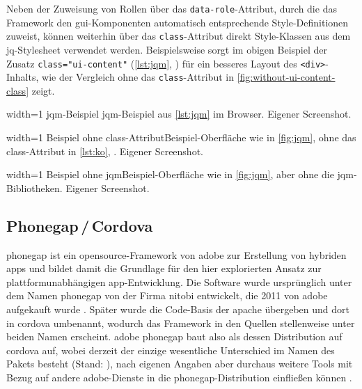 Neben der Zuweisung von Rollen über das \lstinline|data-role|-Attribut, durch die das Framework den \gls{gui}-Komponenten automatisch entsprechende Style-Definitionen zuweist, können weiterhin über das \lstinline|class|-Attribut direkt Style-Klassen aus dem \gls{jq}-Stylesheet verwendet werden.
Beispielsweise sorgt im obigen Beispiel der Zusatz \lstinline|class="ui-content"| (\autoref{lst:jqm}, ) für ein besseres Layout des \lstinline|<div>|-Inhalts, wie der Vergleich ohne das \lstinline|class|-Attribut in \autoref{fig:without-ui-content-class} zeigt.


	{width=1\textwidth}
	{\gls{jqm}-Beispiel}
	{\gls{jqm}-Beispiel aus \autoref{lst:jqm} im Browser.}
	{Eigener Screenshot.}

	{width=1\textwidth}
	{Beispiel ohne class-Attribut}{Beispiel-Oberfläche wie in \autoref{fig:jqm}, ohne das class-Attribut in \autoref{lst:ko}, .}
	{Eigener Screenshot.}

	{width=1\textwidth}
	{Beispiel ohne \gls{jqm}}{Beispiel-Oberfläche wie in \autoref{fig:jqm}, aber ohne die \gls{jqm}-Bibliotheken.}
	{Eigener Screenshot.}

\subsection{Phonegap\,/\,Cordova} \label{sec:cordova}


\gls{phonegap} ist ein \gls{opensource}-Framework von \gls{adobe} zur Erstellung von hybriden \glspl{app} und bildet damit die Grundlage für den hier explorierten Ansatz zur plattformunabhängigen \gls{app}-Entwicklung.
Die Software wurde ursprünglich unter dem Namen \gls{phonegap} von der Firma \gls{nitobi} entwickelt, die 2011 von \gls{adobe} aufgekauft wurde \cite{Adobe_Announces_Agreement_to_Acquire_Nitobi_Creator_of_PhoneGap}. 
Später wurde die Code-Basis der \gls{apache} übergeben und dort in \gls{cordova} umbenannt, wodurch das Framework in den Quellen stellenweise unter beiden Namen erscheint.
\Gls{adobe} \gls{phonegap} baut also als dessen Distribution auf \gls{cordova} auf, wobei derzeit der einzige wesentliche Unterschied im Namen des Pakets besteht (Stand: ), nach eigenen Angaben aber durchaus weitere Tools mit Bezug auf andere \gls{adobe}-Dienste in die \gls{phonegap}-Distribution einfließen können \cite{PhoneGap_Cordova_and_whats_in_a_name}.

